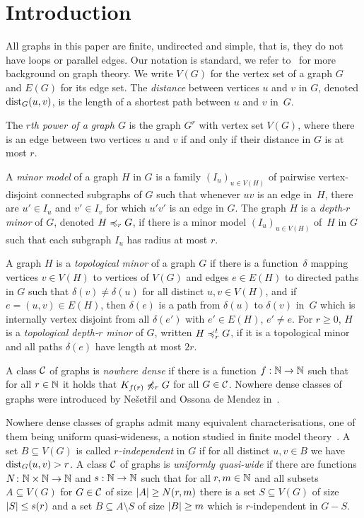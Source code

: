 \section{Introduction}

All graphs in this paper are finite, undirected and simple, that is, 
they do not have loops or parallel edges. Our notation is standard,
we refer to~\cite{diestel2012graph} for more background on 
graph theory. 
We write $V(G)$ for the vertex set of a graph $G$ and
$E(G)$ for its edge set. 
The {\em{distance}} between vertices $u$ and $v$ in $G$, denoted $\mathrm{dist}_G(u,v)$, is the length of a shortest path between $u$ and $v$ in~$G$.

The \emph{$r$th power of a graph $G$} is the graph $G^r$
with vertex set $V(G)$, where there is an edge between two 
vertices $u$ and $v$ if and only if their distance in $G$ is at most $r$. 

A {\em{minor model}} of a graph $H$ in $G$ is a family $(I_u)_{u\in V(H)}$ of pairwise vertex-disjoint connected subgraphs of $G$
such that whenever $uv$ is an edge in~$H$, there are $u'\in I_u$ and $v'\in I_v$ for which $u'v'$ 
is an edge in $G$.
The graph $H$ is a {\em{depth-$r$ minor}} of $G$, denoted $H\preccurlyeq_rG$, if there is a minor model
$(I_u)_{u\in V(H)}$ of~$H$ in $G$ such that each subgraph $I_u$ has radius at most $r$.

A graph $H$ is a \emph{topological minor} of a graph $G$ if there is a
function~$\delta$ mapping vertices $v\in V(H)$ to vertices of $V(G)$ and 
edges $e\in E(H)$ to directed paths in $G$ such that 
$\delta(v)\neq \delta(u)$ for all distinct $u,v\in V(H)$, and 
if $e=(u,v)\in E(H)$, then $\delta(e)$ is a path from 
$\delta(u)$ to $\delta(v)$ in~$G$ which is internally vertex disjoint from all 
$\delta(e')$ with $e'\in E(H)$, $e'\neq e$. 
For $r\geq 0$, $H$ is a \emph{topological depth-$r$ minor} of $G$, 
written $H\preccurlyeq_r^tG$, if it is a topological minor and all paths $\delta(e)$
have length at most $2r$. 

A class $\mathcal{C}$ of graphs is \emph{nowhere dense} if there is a function 
$f:\mathbb{N}\rightarrow \mathbb{N}$ such that for all $r\in \mathbb{N}$ it holds that $K_{f(r)}\not\preccurlyeq_r G$
for all $G\in \mathcal{C}$. Nowhere dense classes of graphs were introduced by
Ne\v{s}et\v{r}il and Ossona de Mendez in~\cite{nevsetvril2010first,nevsetvril2011nowhere}.

Nowhere dense classes of graphs admit many equivalent characterisations, 
one of them being uniform quasi-wideness, a notion studied in 
finite model theory~\cite{dawar2010homomorphism}.  
A set $B\subseteq V(G)$ is called {\em{$r$-independent}} in $G$ if for all
distinct $u,v\in B$ we have $\mathrm{dist}_G(u,v)>r$.
A class $\mathcal{C}$ of graphs is \emph{uniformly quasi-wide} if there are
functions $N\colon \mathbb{N}\times\mathbb{N}\rightarrow \mathbb{N}$ and $s:\mathbb{N}\rightarrow \mathbb{N}$ such
that for all $r,m\in \mathbb{N}$ and all subsets $A\subseteq V(G)$ for
$G\in \mathcal{C}$ of size $\left\lvert A\right\rvert\geq N(r,m)$ there is a set
$S\subseteq V(G)$ of size $\left\lvert S\right\rvert\leq s(r)$ and a set
$B\subseteq A\setminus S$ of size $\left\lvert B\right\rvert\geq m$ which is $r$-independent in
$G-S$. 

